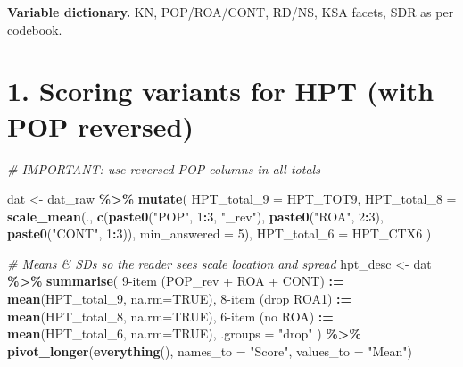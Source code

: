 \documentclass[
  10pt,
]{article}
\newenvironment{Shaded}{\begin{snugshade}}{\end{snugshade}}
\newcommand{\AttributeTok}[1]{\textcolor[rgb]{0.13,0.29,0.53}{#1}}
\newcommand{\CommentTok}[1]{\textcolor[rgb]{0.56,0.35,0.01}{\textit{#1}}}
\newcommand{\ConstantTok}[1]{\textcolor[rgb]{0.56,0.35,0.01}{#1}}
\newcommand{\DecValTok}[1]{\textcolor[rgb]{0.00,0.00,0.81}{#1}}
\newcommand{\FunctionTok}[1]{\textcolor[rgb]{0.13,0.29,0.53}{\textbf{#1}}}
\newcommand{\NormalTok}[1]{#1}
\newcommand{\OtherTok}[1]{\textcolor[rgb]{0.56,0.35,0.01}{#1}}
\newcommand{\SpecialCharTok}[1]{\textcolor[rgb]{0.81,0.36,0.00}{\textbf{#1}}}
\newcommand{\StringTok}[1]{\textcolor[rgb]{0.31,0.60,0.02}{#1}}
\begin{document}
\textbf{Variable dictionary.} KN, POP/ROA/CONT, RD/NS, KSA facets, SDR
as per codebook.

\hypertarget{scoring-variants-for-hpt-with-pop-reversed}{%
\section{1. Scoring variants for HPT (with POP
reversed)}\label{scoring-variants-for-hpt-with-pop-reversed}}

\begin{Shaded}
\begin{Highlighting}[]
\CommentTok{\# IMPORTANT: use reversed POP columns in all totals}

\NormalTok{dat }\OtherTok{\textless{}{-}}\NormalTok{ dat\_raw }\SpecialCharTok{\%\textgreater{}\%}
  \FunctionTok{mutate}\NormalTok{(}
    \AttributeTok{HPT\_total\_9 =}\NormalTok{ HPT\_TOT9,}
    \AttributeTok{HPT\_total\_8 =} \FunctionTok{scale\_mean}\NormalTok{(., }\FunctionTok{c}\NormalTok{(}\FunctionTok{paste0}\NormalTok{(}\StringTok{"POP"}\NormalTok{, }\DecValTok{1}\SpecialCharTok{:}\DecValTok{3}\NormalTok{, }\StringTok{"\_rev"}\NormalTok{),}
                                  \FunctionTok{paste0}\NormalTok{(}\StringTok{"ROA"}\NormalTok{, }\DecValTok{2}\SpecialCharTok{:}\DecValTok{3}\NormalTok{),}
                                  \FunctionTok{paste0}\NormalTok{(}\StringTok{"CONT"}\NormalTok{, }\DecValTok{1}\SpecialCharTok{:}\DecValTok{3}\NormalTok{)), }\AttributeTok{min\_answered =} \DecValTok{5}\NormalTok{),}
    \AttributeTok{HPT\_total\_6 =}\NormalTok{ HPT\_CTX6}
\NormalTok{  )}

\CommentTok{\# Means \& SDs so the reader sees scale location and spread}
\NormalTok{hpt\_desc }\OtherTok{\textless{}{-}}\NormalTok{ dat }\SpecialCharTok{\%\textgreater{}\%}
  \FunctionTok{summarise}\NormalTok{(}
    \StringTok{\textasciigrave{}}\AttributeTok{9{-}item (POP\_rev + ROA + CONT)}\StringTok{\textasciigrave{}} \SpecialCharTok{:=} \FunctionTok{mean}\NormalTok{(HPT\_total\_9,  }\AttributeTok{na.rm=}\ConstantTok{TRUE}\NormalTok{),}
    \StringTok{\textasciigrave{}}\AttributeTok{8{-}item (drop ROA1)}\StringTok{\textasciigrave{}}            \SpecialCharTok{:=} \FunctionTok{mean}\NormalTok{(HPT\_total\_8,  }\AttributeTok{na.rm=}\ConstantTok{TRUE}\NormalTok{),}
    \StringTok{\textasciigrave{}}\AttributeTok{6{-}item (no ROA)}\StringTok{\textasciigrave{}}               \SpecialCharTok{:=} \FunctionTok{mean}\NormalTok{(HPT\_total\_6,  }\AttributeTok{na.rm=}\ConstantTok{TRUE}\NormalTok{),}
    \AttributeTok{.groups =} \StringTok{"drop"}
\NormalTok{  ) }\SpecialCharTok{\%\textgreater{}\%}
  \FunctionTok{pivot\_longer}\NormalTok{(}\FunctionTok{everything}\NormalTok{(), }\AttributeTok{names\_to =} \StringTok{"Score"}\NormalTok{, }\AttributeTok{values\_to =} \StringTok{"Mean"}\NormalTok{)}


\end{Highlighting}
\end{Shaded}
\end{document}
